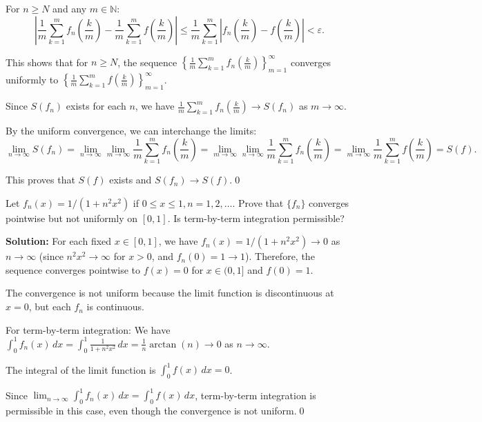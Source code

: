 For \( n \geq N \) and any \( m \in \mathbb{N} \):
\[\left|\frac{1}{m} \sum_{k=1}^m f_n \left( \frac{k}{m} \right) - \frac{1}{m} \sum_{k=1}^m f \left( \frac{k}{m} \right)\right| \leq \frac{1}{m} \sum_{k=1}^m \left|f_n \left( \frac{k}{m} \right) - f \left( \frac{k}{m} \right)\right| < \varepsilon.\]

This shows that for \( n \geq N \), the sequence \( \left\{\frac{1}{m} \sum_{k=1}^m f_n \left( \frac{k}{m} \right)\right\}_{m=1}^{\infty} \) converges uniformly to \( \left\{\frac{1}{m} \sum_{k=1}^m f \left( \frac{k}{m} \right)\right\}_{m=1}^{\infty} \).

Since \( S(f_n) \) exists for each \( n \), we have \( \frac{1}{m} \sum_{k=1}^m f_n \left( \frac{k}{m} \right) \to S(f_n) \) as \( m \to \infty \).

By the uniform convergence, we can interchange the limits:
\[\lim_{n \to \infty} S(f_n) = \lim_{n \to \infty} \lim_{m \to \infty} \frac{1}{m} \sum_{k=1}^m f_n \left( \frac{k}{m} \right) = \lim_{m \to \infty} \lim_{n \to \infty} \frac{1}{m} \sum_{k=1}^m f_n \left( \frac{k}{m} \right) = \lim_{m \to \infty} \frac{1}{m} \sum_{k=1}^m f \left( \frac{k}{m} \right) = S(f).\]

This proves that \( S(f) \) exists and \( S(f_n) \to S(f) \).\qed


\begin{problembox}
Let \( f_n(x) = 1/(1 + n^2x^2) \) if \( 0 \leq x \leq 1, n = 1, 2, \ldots \). Prove that \(\{f_n\}\) converges pointwise but not uniformly on \([0, 1]\). Is term-by-term integration permissible?
\end{problembox}

\bigskip\noindent\textbf{Solution:} For each fixed \( x \in [0, 1] \), we have \( f_n(x) = 1/(1 + n^2x^2) \to 0 \) as \( n \to \infty \) (since \( n^2x^2 \to \infty \) for \( x > 0 \), and \( f_n(0) = 1 \to 1 \)). Therefore, the sequence converges pointwise to \( f(x) = 0 \) for \( x \in (0, 1] \) and \( f(0) = 1 \).

The convergence is not uniform because the limit function is discontinuous at \( x = 0 \), but each \( f_n \) is continuous.

For term-by-term integration: We have \( \int_0^1 f_n(x) \, dx = \int_0^1 \frac{1}{1 + n^2x^2} \, dx = \frac{1}{n} \arctan(n) \to 0 \) as \( n \to \infty \).

The integral of the limit function is \( \int_0^1 f(x) \, dx = 0 \).

Since \( \lim_{n \to \infty} \int_0^1 f_n(x) \, dx = \int_0^1 f(x) \, dx \), term-by-term integration is permissible in this case, even though the convergence is not uniform.\qed



